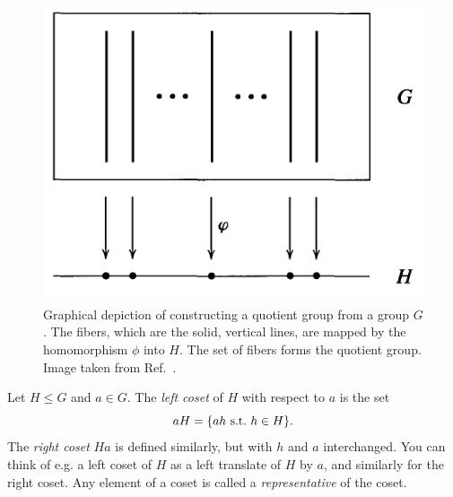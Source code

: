 \begin{figure}
  \centering
  \includegraphics[width=0.60\linewidth]{figs/quotientGroup.pdf}
  \caption{Graphical depiction of constructing a quotient group from a group
$G$. The fibers, which are the solid, vertical lines, are mapped by the homomorphism 
$\phi$ into $H$. The set of fibers forms the quotient group. Image taken
from Ref.~\cite{dummit_abstract_2004}.}
  \label{fig:quotientGroup}
\end{figure}

Let $H\le G$ and $a\in G$. The {\it left coset} of $H$ with respect to 
$a$ is the set
\begin{equation}
   aH=\{ah~\text{s.t.}~ h\in H\}. 
\end{equation}
The {\it right coset} $Ha$ is defined similarly, but with $h$ and $a$
interchanged. You can think of e.g. a left coset of $H$ as a left translate of
$H$ by $a$, and similarly for the right coset. Any element of a coset is
called a {\it representative} of the coset.


